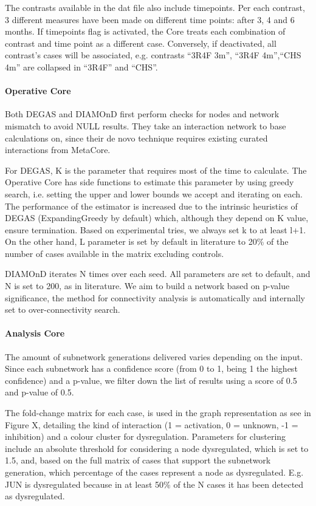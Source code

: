 The contrasts available in the dat file also include timepoints. Per each contrast, 3 different measures have been made on different time points: after 3, 4 and 6 months. If timepoints flag is activated, the Core treats each combination of contrast and time point as a different case. Conversely, if deactivated, all contrast’s cases will be associated, e.g. contrasts “3R4F 3m”, “3R4F 4m”,“CHS 4m” are collapsed in “3R4F” and “CHS”.

\paragraph{Operative Core}
\label{section:desna-o}
Both DEGAS and DIAMOnD first perform checks for nodes and network mismatch to avoid NULL results. They take an interaction network to base calculations on, since their de novo technique requires existing curated interactions from MetaCore.

For DEGAS, K is the parameter that requires most of the time to calculate. The Operative Core has side functions to estimate this parameter by using greedy search, i.e. setting the upper and lower bounds we accept and iterating on each. The performance of the estimator is increased due to the intrinsic heuristics of DEGAS (ExpandingGreedy by default) which, although they depend on K value, ensure termination. Based on experimental tries, we always set k to at least l+1. 
On the other hand, L parameter is set by default in literature to 20\% of the number of cases available in the matrix excluding controls.

DIAMOnD iterates N times over each seed. All parameters are set to default, and N is set to 200, as in literature. We aim to build a network based on p-value significance, the method for connectivity analysis is automatically and internally set to over-connectivity search.

\paragraph{Analysis Core}
The amount of subnetwork generations delivered varies depending on the input. Since each subnetwork has a confidence score (from 0 to 1, being 1 the highest confidence) and a p-value, we filter down the list of results using a score of 0.5 and p-value of 0.5.

The fold-change matrix for each case, is used in the graph representation as see in Figure X, detailing the kind of interaction (1 = activation, 0 = unknown, -1 = inhibition) and a colour cluster for dysregulation. Parameters for clustering include an absolute threshold for considering a node dysregulated, which is set to 1.5, and, based on the full matrix of cases that support the subnetwork generation, which percentage of the cases represent a node as dysregulated. E.g. JUN is dysregulated because in at least 50\% of the N cases it has been detected as dysregulated.


